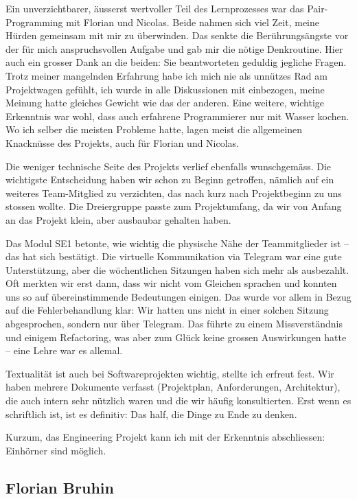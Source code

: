 \documentclass[a4paper]{article}
\begin{document}
Ein unverzichtbarer, äusserst wertvoller Teil des Lernprozesses war das Pair-Programming mit Florian und Nicolas. Beide nahmen sich viel Zeit, meine Hürden gemeinsam mit mir zu überwinden. Das senkte die Berührungsängste vor der für mich anspruchsvollen Aufgabe und gab mir die nötige Denkroutine. Hier auch ein grosser Dank an die beiden: Sie beantworteten geduldig jegliche Fragen. Trotz meiner mangelnden Erfahrung habe ich mich nie als unnützes Rad am Projektwagen gefühlt, ich wurde in alle Diskussionen mit einbezogen, meine Meinung hatte gleiches Gewicht wie das der anderen. Eine weitere, wichtige Erkenntnis war wohl, dass auch erfahrene Programmierer nur mit Wasser kochen. Wo ich selber die meisten Probleme hatte, lagen meist die allgemeinen Knacknüsse des Projekts, auch für Florian und Nicolas.

Die weniger technische Seite des Projekts verlief ebenfalls wunschgemäss. Die wichtigste Entscheidung haben wir schon zu Beginn getroffen, nämlich auf ein weiteres Team-Mitglied zu verzichten, das nach kurz nach Projektbeginn zu uns stossen wollte. Die Dreiergruppe passte zum Projektumfang, da wir von Anfang an das Projekt klein, aber ausbaubar gehalten haben.

Das Modul SE1 betonte, wie wichtig die physische Nähe der Teammitglieder ist -- das hat sich bestätigt. Die virtuelle Kommunikation via Telegram war eine gute Unterstützung, aber die wöchentlichen Sitzungen haben sich mehr als ausbezahlt. Oft merkten wir erst dann, dass wir nicht vom Gleichen sprachen und konnten uns so auf übereinstimmende Bedeutungen einigen. Das wurde vor allem in Bezug auf die Fehlerbehandlung klar: Wir hatten uns nicht in einer solchen Sitzung abgesprochen, sondern nur über Telegram. Das führte zu einem Missverständnis und einigem Refactoring, was aber zum Glück keine grossen Auswirkungen hatte -- eine Lehre war es allemal.

Textualität ist auch bei Softwareprojekten wichtig, stellte ich erfreut fest. Wir haben mehrere Dokumente verfasst (Projektplan, Anforderungen, Architektur), die auch intern sehr nützlich waren und die wir häufig konsultierten. Erst wenn es schriftlich ist, ist es definitiv: Das half, die Dinge zu Ende zu denken.

Kurzum, das Engineering Projekt kann ich mit der Erkenntnis abschliessen: Einhörner sind möglich.

\pagebreak

\subsection{Florian Bruhin}
\end{document}
